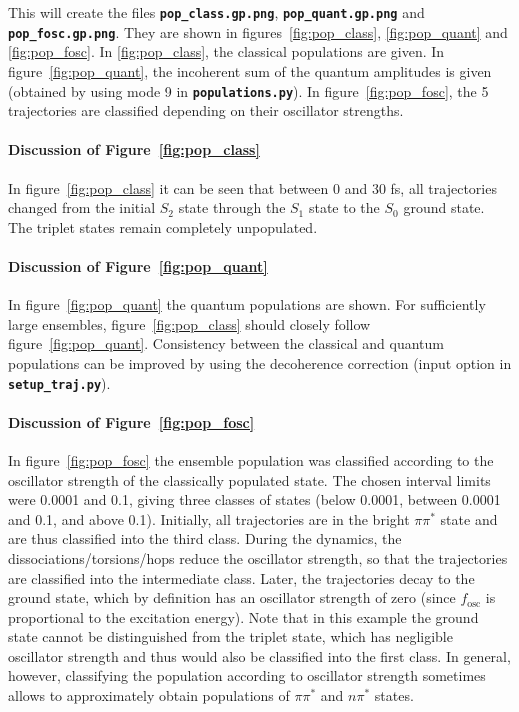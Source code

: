 \documentclass[a4paper,11pt,DIV=15,openany]{scrbook}
\newcommand{\ttt}[1]{\textbf{\texttt{#1}}}
\begin{document}
This will create the files \ttt{pop\_class.gp.png}, \ttt{pop\_quant.gp.png} and \ttt{pop\_fosc.gp.png}. They are shown in figures~\ref{fig:pop_class}, \ref{fig:pop_quant} and \ref{fig:pop_fosc}. 
In \ref{fig:pop_class}, the classical populations are given. 
In figure~\ref{fig:pop_quant}, the incoherent sum of the quantum amplitudes is given (obtained by using mode 9 in \ttt{populations.py}).
In figure~\ref{fig:pop_fosc}, the 5 trajectories are classified depending on their oscillator strengths.



\paragraph{Discussion of Figure~\ref{fig:pop_class}}

In figure~\ref{fig:pop_class} it can be seen that between 0 and 30 fs, all trajectories changed from the initial $S_2$ state through the $S_1$ state to the $S_0$ ground state. The triplet states remain completely unpopulated. 

\paragraph{Discussion of Figure~\ref{fig:pop_quant}}

In figure~\ref{fig:pop_quant} the quantum populations are shown. For sufficiently large ensembles, figure~\ref{fig:pop_class} should closely follow figure~\ref{fig:pop_quant}. Consistency between the classical and quantum populations can be improved by using the decoherence correction (input option in \ttt{setup\_traj.py}).

\paragraph{Discussion of Figure~\ref{fig:pop_fosc}}

In figure~\ref{fig:pop_fosc} the ensemble population was classified according to the oscillator strength of the classically populated state. 
The chosen interval limits were 0.0001 and 0.1, giving three classes of states (below 0.0001, between 0.0001 and 0.1, and above 0.1). 
Initially, all trajectories are in the bright $\pi\pi^*$ state and are thus classified into the third class. 
During the dynamics, the dissociations/torsions/hops reduce the oscillator strength, so that the trajectories are classified into the intermediate class.
Later, the trajectories decay to the ground state, which by definition has an oscillator strength of zero (since $f_\text{osc}$ is proportional to the excitation energy). 
Note that in this example the ground state cannot be distinguished from the triplet state, which has negligible oscillator strength and thus would also be classified into the first class.
In general, however, classifying the population according to oscillator strength sometimes allows to approximately obtain populations of $\pi\pi^*$ and $n\pi^*$ states.
\end{document}
